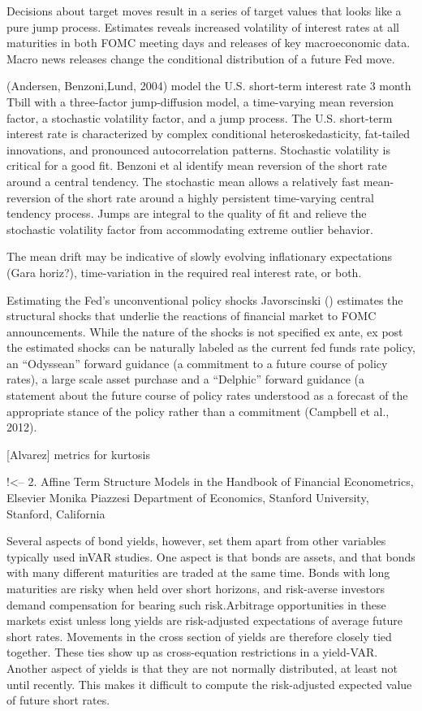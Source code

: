 \documentclass[
]{article}
\begin{document}
Decisions about target moves result in a series of target values that looks like a pure jump process. Estimates reveals increased volatility of interest rates at all maturities in both FOMC meeting days and releases of key macroeconomic data. Macro news releases change the conditional distribution of a future Fed move.

(Andersen, Benzoni,Lund, 2004) model the U.S. short-term interest rate 3 month Tbill with a three-factor jump-diffusion model, a time-varying mean reversion factor, a stochastic volatility factor, and a jump process. The U.S. short-term interest rate is characterized by complex conditional heteroskedasticity, fat-tailed innovations, and pronounced autocorrelation patterns. Stochastic volatility is critical for a good fit. Benzoni et al identify mean reversion of the short rate around a central tendency. The stochastic mean allows a relatively fast mean-reversion of the short rate around a highly persistent time-varying central tendency process. Jumps are integral to the quality of fit and relieve the stochastic volatility factor from accommodating extreme outlier behavior.

The mean drift may be indicative of slowly evolving inflationary expectations (Gara horiz?), time-variation in the required real interest rate, or both.

Estimating the Fed's unconventional policy shocks Javorscinski () estimates the structural shocks that underlie the reactions of financial market to FOMC announcements. While the nature of the shocks is not specified ex ante, ex post the estimated shocks can be naturally labeled as the current fed funds rate policy, an ``Odyssean'' forward guidance (a commitment to a future course of policy rates), a large scale asset purchase and a ``Delphic'' forward guidance (a statement about the future course of policy rates understood as a forecast of the appropriate stance of the policy rather than a commitment (Campbell et al., 2012).

{[}Alvarez{]} metrics for kurtosis

!\textless--
2. Affine Term Structure Models in the Handbook of Financial Econometrics, Elsevier
Monika Piazzesi
Department of Economics, Stanford University, Stanford, California

Several aspects of bond
yields, however, set them apart from other variables typically used inVAR studies. One
aspect is that bonds are assets, and that bonds with many different maturities are traded at
the same time. Bonds with long maturities are risky when held over short horizons, and
risk-averse investors demand compensation for bearing such risk.Arbitrage opportunities
in these markets exist unless long yields are risk-adjusted expectations of average future
short rates. Movements in the cross section of yields are therefore closely tied together.
These ties show up as cross-equation restrictions in a yield-VAR. Another aspect of yields is
that they are not normally distributed, at least not until recently. This makes it difficult
to compute the risk-adjusted expected value of future short rates.
\end{document}

